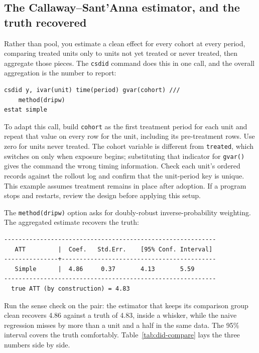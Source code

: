 \subsection{The Callaway--Sant'Anna estimator, and the truth recovered}
Rather than pool, you estimate a clean effect for every cohort at every period, comparing treated units only to units not yet treated or never treated, then aggregate those pieces. The \texttt{csdid} command does this in one call, and the overall aggregation is the number to report:
\par
{\footnotesize
\begin{verbatim}
csdid y, ivar(unit) time(period) gvar(cohort) ///
    method(dripw)
estat simple
\end{verbatim}
}
To adapt this call, build \texttt{cohort} as the first treatment period for each unit and repeat that value on every row for the unit, including its pre-treatment rows. Use zero for units never treated. The cohort variable is different from \texttt{treated}, which switches on only when exposure begins; substituting that indicator for \texttt{gvar()} gives the command the wrong timing information. Check each unit's ordered records against the rollout log and confirm that the unit-period key is unique. This example assumes treatment remains in place after adoption. If a program stops and restarts, review the design before applying this setup.

The \texttt{method(dripw)} option asks for doubly-robust inverse-probability weighting. The aggregated estimate recovers the truth:
\par
{\footnotesize
\begin{verbatim}
-----------------------------------------------------------
   ATT         |  Coef.   Std.Err.    [95% Conf. Interval]
---------------+-------------------------------------------
   Simple      |  4.86     0.37       4.13       5.59
-----------------------------------------------------------
  true ATT (by construction) = 4.83
\end{verbatim}
}
Run the sense check on the pair: the estimator that keeps its comparison group clean recovers 4.86 against a truth of 4.83, inside a whisker, while the naive regression misses by more than a unit and a half in the same data. The 95\% interval covers the truth comfortably. Table~\ref{tab:did-compare} lays the three numbers side by side.

